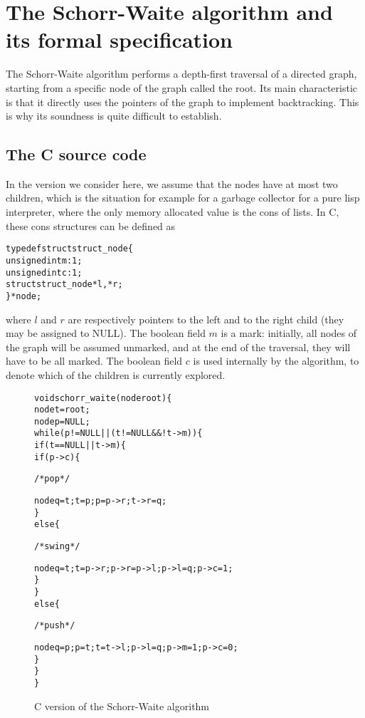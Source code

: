 
\section{The Schorr-Waite algorithm and its formal specification}
\label{sec:algo}

The Schorr-Waite algorithm performs a depth-first traversal of a
directed graph, starting from a specific node of the graph called the
root. Its main characteristic is that it directly uses the pointers of
the graph to implement backtracking. This is why its soundness is
quite difficult to establish. 

\subsection{The C source code}

In the version we consider here, we assume that the nodes have
at most two children, which is the situation for example for a garbage
collector for a pure lisp interpreter, where the only memory allocated
value is the \textsf{cons} of lists. In C, these \textsf{cons}
structures can be defined as
\begin{alltt}
typedef struct struct_node \{
  unsigned int m :1;
  unsigned int c :1;
  struct struct_node *l, *r;
\} * node;
\end{alltt}
where $l$ and $r$ are respectively pointers to the left and to the
right child (they may be assigned to NULL). The boolean field $m$ is a
mark: initially, all nodes of the graph will be assumed unmarked, and
at the end of the traversal, they will have to be all marked. The
boolean field $c$ is used internally by the algorithm, to denote which
of the children is currently explored.
 
\begin{figure}[b]
\hrulefill
\begin{alltt}
void schorr_waite(node root) \{
  node t = root;
  node p = NULL;
  while (p != NULL || (t != NULL && ! t->m)) \{
    if (t == NULL || t->m) \{
      if (p->c) \{ \begin{slshape}/* pop */\end{slshape}
        node q = t; t = p; p = p->r; t->r = q;
      \} 
      else \{ \begin{slshape}/* swing */\end{slshape}
        node q = t; t = p->r; p->r = p->l; p->l = q; p->c = 1;
      \}
    \} 
    else \{ \begin{slshape}/* push */ \end{slshape}
      node q = p; p = t; t = t->l; p->l = q; p->m = 1; p->c = 0;
    \}
  \}
\}
\end{alltt}
\vspace*{-5mm}
\caption{C version of the Schorr-Waite algorithm}
\label{fig:code}
\end{figure}

